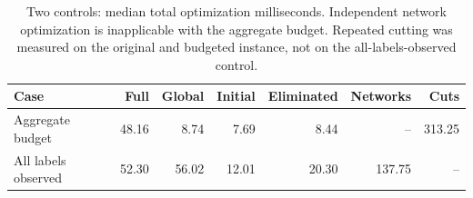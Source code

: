 \begin{table}[tb]\centering\small
\caption{Two controls: median total optimization milliseconds. Independent network optimization is inapplicable with the aggregate budget. Repeated cutting was measured on the original and budgeted instance, not on the all-labels-observed control.}
\label{tab:computation-ablations}
\setlength{\tabcolsep}{3pt}
\begin{tabular}{lrrrrrr}\toprule
Case & Full & Global & Initial & Eliminated & Networks & Cuts\\\midrule
Aggregate budget & 48.16 & 8.74 & 7.69 & 8.44 & -- & 313.25 \\
All labels observed & 52.30 & 56.02 & 12.01 & 20.30 & 137.75 & -- \\
\bottomrule\end{tabular}\end{table}
